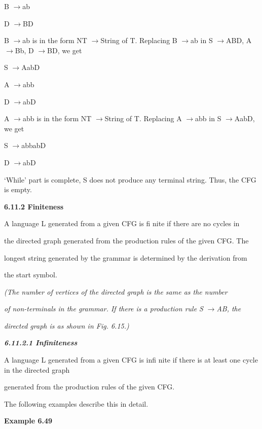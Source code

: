 \noindent B $\to $ab

\noindent D $\to $BD

\noindent 

\noindent 

\noindent 

\noindent 

\noindent 

\noindent 

\noindent B $\to $ab is in the form NT $\to $String of T. Replacing B $\to $ab in S $\to $ABD, A $\to $Bb, D $\to $BD, we get

\noindent S $\to $AabD

\noindent A $\to $abb

\noindent D $\to $abD

\noindent A $\to $abb is in the form NT $\to $String of T. Replacing A $\to $abb in S $\to $AabD, we get

\noindent S $\to $abbabD

\noindent D $\to $abD

\noindent `While' part is complete, S does not produce any terminal string. Thus, the CFG is empty.

\noindent \textbf{6.11.2 Finiteness}

\noindent A language L generated from a given CFG is fi nite if there are no cycles in

\noindent the directed graph generated from the production rules of the given CFG. The

\noindent longest string generated by the grammar is determined by the derivation from

\noindent the start symbol.

\noindent \textit{(The number of vertices of the directed graph is the same as the number}

\noindent \textit{of non-terminals in the grammar. If there is a production rule S }$\to $\textit{AB, the}

\noindent \textit{directed graph is as shown in Fig. 6.15.)}

\noindent \textbf{\textit{6.11.2.1 Infiniteness}}

\noindent A language L generated from a given CFG is infi nite if there is at least one cycle in the directed graph

\noindent generated from the production rules of the given CFG.

\noindent The following examples describe this in detail.

\noindent \textbf{Example 6.49}


